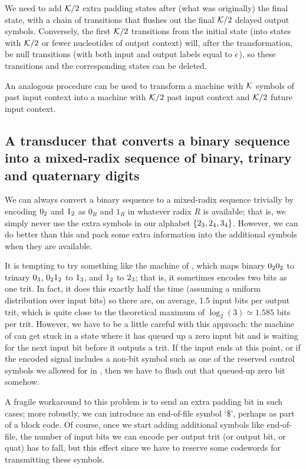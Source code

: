 \documentclass[english]{article}
\begin{document}
We need to add ${\cal K}/2$ extra padding states after (what was originally) the final state,
with a chain of transitions that flushes out the final ${\cal K}/2$ delayed output symbols.
Conversely, the first ${\cal K}/2$ transitions from the initial state
(into states with ${\cal K}/2$ or fewer nucleotides of output context)
will, after the transformation,
be null transitions (with both input and output labels equal to $\epsilon$),
so these transitions and the corresponding states can be deleted.

An analogous procedure can be used to transform a machine with ${\cal K}$ symbols of past input context
into a machine with ${\cal K}/2$ past input context and ${\cal K}/2$ future input context.

\subsection{A transducer that converts a binary sequence into a mixed-radix sequence of binary, trinary and quaternary digits}

We can always convert a binary sequence to a mixed-radix sequence trivially by encoding
$0_2$ and $1_2$ as $0_R$ and $1_R$ in whatever radix $R$ is available;
that is, we simply never use the extra symbols in our alphabet $\{ 2_3, 2_4, 3_4 \}$.
However, we can do better than this and pack some extra information into the additional symbols when they are available.

It is tempting to try something like the machine of ,
which maps binary $0_20_2$ to trinary $0_3$,
$0_21_2$ to $1_3$,
and $1_2$ to $2_3$;
that is, it sometimes encodes two bits as one trit.
In fact, it does this exactly half the time (assuming a uniform distribution over input bits)
so there are, on average, 1.5 input bits per output trit,
which is quite close to the theoretical maximum of $\log_2(3) \simeq 1.585$ bits per trit.
However, we have to be a little careful with this approach:
the machine of  can get stuck in a state where it has queued up a zero input bit
and is waiting for the next input bit before it outputs a trit.
If the input ends at this point, or if the encoded signal includes a non-bit symbol
such as one of the reserved control symbols we allowed for in ,
then we have to flush out that queued-up zero bit somehow.

A fragile workaround to this problem is to send an extra padding bit in such cases;
more robustly, we can introduce an end-of-file symbol `\$',
perhaps as part of a block code.
Of course, once we start adding additional symbols like end-of-file, the number of input bits we can encode per output trit (or output bit, or quat) has to fall,
but this effect 
since we have to reserve some codewords for transmitting these symbols.
\end{document}
